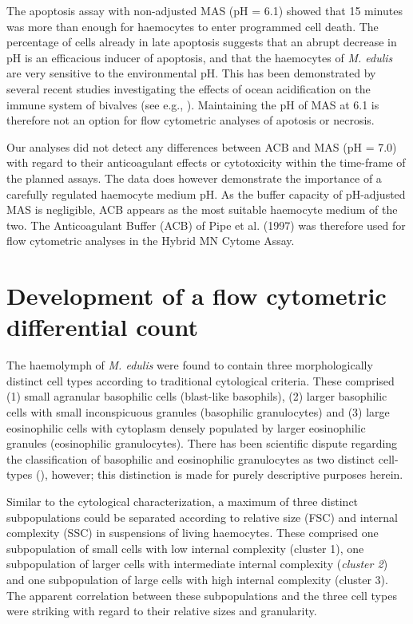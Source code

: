The apoptosis assay with non-adjusted MAS (pH = 6.1) showed that 15 minutes was more than enough for haemocytes to enter programmed cell death. The percentage of cells already in late apoptosis suggests that an abrupt decrease in pH is an efficacious inducer of apoptosis, and that the haemocytes of \emph{M. edulis} are very sensitive to the environmental pH. This has been demonstrated by several recent studies investigating the effects of ocean acidification on the immune system of bivalves (see e.g., \cite{Wang2016, Dang2023}). Maintaining the pH of MAS at 6.1 is therefore not an option for flow cytometric analyses of apotosis or necrosis.

Our analyses did not detect any differences between ACB and MAS (pH = 7.0) with regard to their anticoagulant effects or cytotoxicity within the time-frame of the planned assays. The data does however demonstrate the importance of a carefully regulated haemocyte medium pH. As the buffer capacity of pH-adjusted MAS is negligible, ACB appears as the most suitable haemocyte medium of the two. The Anticoagulant Buffer (ACB) of Pipe et al. (1997) was therefore used for flow cytometric analyses in the Hybrid MN Cytome Assay.

\section{Development of a flow cytometric differential count}
The haemolymph of \emph{M. edulis} were found to contain three morphologically distinct cell types according to traditional cytological criteria. These comprised (1) small agranular basophilic cells (blast-like basophils), (2) larger basophilic cells with small inconspicuous granules (basophilic granulocytes) and (3) large eosinophilic cells with cytoplasm densely populated by larger eosinophilic granules (eosinophilic granulocytes). There has been scientific dispute regarding the classification of basophilic and eosinophilic granulocytes as two distinct cell-types (\cite{Cheng1980}), however; this distinction is made for purely descriptive purposes herein.

Similar to the cytological characterization, a maximum of three distinct subpopulations could be separated according to relative size (FSC) and internal complexity (SSC) in suspensions of living haemocytes. These comprised one subpopulation of small cells with low internal complexity (cluster 1), one subpopulation of larger cells with intermediate internal complexity (\emph{cluster 2}) and one subpopulation of large cells with high internal complexity (cluster 3). The apparent correlation between these subpopulations and the three cell types were striking with regard to their relative sizes and granularity.

